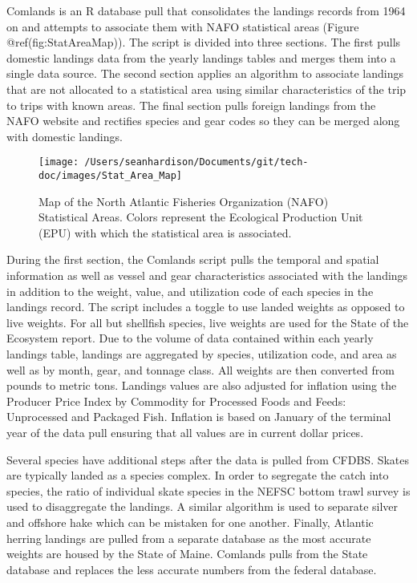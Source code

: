 \documentclass[]{article}
\begin{document}
Comlands is an R database pull that consolidates the landings records
from 1964 on and attempts to associate them with NAFO statistical areas
(Figure @ref(fig:StatAreaMap)). The script is divided into three
sections. The first pulls domestic landings data from the yearly
landings tables and merges them into a single data source. The second
section applies an algorithm to associate landings that are not
allocated to a statistical area using similar characteristics of the
trip to trips with known areas. The final section pulls foreign landings
from the NAFO website and rectifies species and gear codes so they can
be merged along with domestic landings.

\begin{figure}

{\centering \texttt{[image: /Users/seanhardison/Documents/git/tech-doc/images/Stat\_Area\_Map]} 

}

\caption{Map of the North Atlantic Fisheries Organization (NAFO) Statistical Areas.  Colors represent the Ecological Production Unit (EPU) with which the statistical area is associated.}\label{fig:StatAreaMap}
\end{figure}

During the first section, the Comlands script pulls the temporal and
spatial information as well as vessel and gear characteristics
associated with the landings in addition to the weight, value, and
utilization code of each species in the landings record. The script
includes a toggle to use landed weights as opposed to live weights. For
all but shellfish species, live weights are used for the State of the
Ecosystem report. Due to the volume of data contained within each yearly
landings table, landings are aggregated by species, utilization code,
and area as well as by month, gear, and tonnage class. All weights are
then converted from pounds to metric tons. Landings values are also
adjusted for inflation using the Producer Price Index by Commodity for
Processed Foods and Feeds: Unprocessed and Packaged Fish. Inflation is
based on January of the terminal year of the data pull ensuring that all
values are in current dollar prices.

Several species have additional steps after the data is pulled from
CFDBS. Skates are typically landed as a species complex. In order to
segregate the catch into species, the ratio of individual skate species
in the NEFSC bottom trawl survey is used to disaggregate the landings. A
similar algorithm is used to separate silver and offshore hake which can
be mistaken for one another. Finally, Atlantic herring landings are
pulled from a separate database as the most accurate weights are housed
by the State of Maine. Comlands pulls from the State database and
replaces the less accurate numbers from the federal database.
\end{document}

